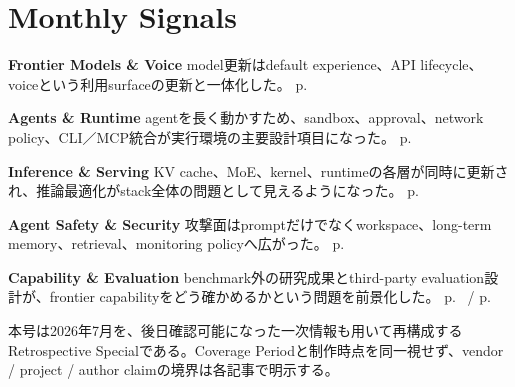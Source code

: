 \section*{Monthly Signals}
\smallskip
\noindent \textbf{Frontier Models \& Voice} model更新はdefault experience、API lifecycle、voiceという利用surfaceの更新と一体化した。 \hfill{\footnotesize p.~\pageref{pkg:frontier-models-may}}
\par
\smallskip
\noindent \textbf{Agents \& Runtime} agentを長く動かすため、sandbox、approval、network policy、CLI／MCP統合が実行環境の主要設計項目になった。 \hfill{\footnotesize p.~\pageref{pkg:agents-runtime-may}}
\par
\smallskip
\noindent \textbf{Inference \& Serving} KV cache、MoE、kernel、runtimeの各層が同時に更新され、推論最適化がstack全体の問題として見えるようになった。 \hfill{\footnotesize p.~\pageref{pkg:inference-serving-may}}
\par
\smallskip
\noindent \textbf{Agent Safety \& Security} 攻撃面はpromptだけでなくworkspace、long-term memory、retrieval、monitoring policyへ広がった。 \hfill{\footnotesize p.~\pageref{pkg:agent-safety-security-may}}
\par
\smallskip
\noindent \textbf{Capability \& Evaluation} benchmark外の研究成果とthird-party evaluation設計が、frontier capabilityをどう確かめるかという問題を前景化した。 \hfill{\footnotesize p.~\pageref{pkg:capability-evaluation-may} / p.~\pageref{pkg:paper-watch-may}}
\par
\medskip
\begin{claimboundary}
本号は2026年7月を、後日確認可能になった一次情報も用いて再構成するRetrospective Specialである。Coverage Periodと制作時点を同一視せず、vendor / project / author claimの境界は各記事で明示する。
\end{claimboundary}
\medskip
\tableofcontents

